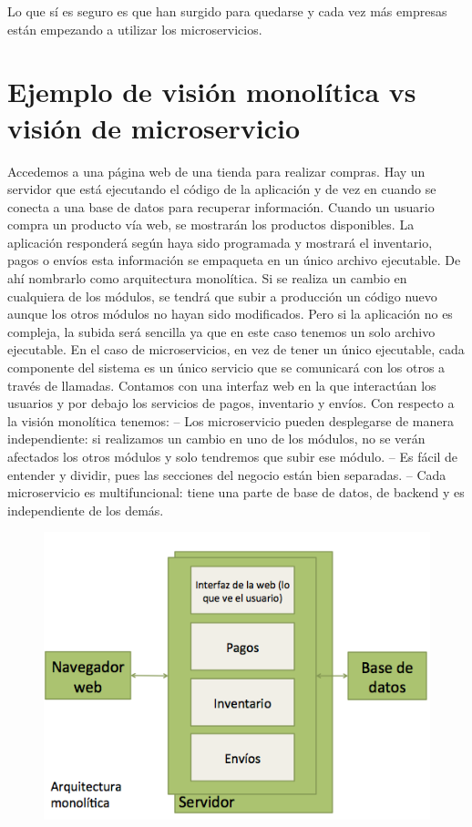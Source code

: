 \documentclass[12pt]{report} %
\begin{document}
Lo que sí es seguro es que han surgido para quedarse y cada vez más empresas están empezando a utilizar los microservicios.


\section{Ejemplo de visión monolítica vs visión de microservicio}



Accedemos a una página web de una tienda para realizar compras. Hay un servidor que está ejecutando el código de la aplicación y de vez en cuando se conecta a una base de datos para recuperar información.
Cuando un usuario compra un producto vía web, se mostrarán los productos disponibles. La aplicación responderá según haya sido programada y mostrará el inventario, pagos o envíos esta información se empaqueta en un único archivo ejecutable. De ahí nombrarlo como arquitectura monolítica.
Si se realiza un cambio en cualquiera de los módulos, se tendrá que subir a producción un código nuevo aunque los otros módulos no hayan sido modificados. 
Pero si la aplicación no es compleja, la subida será sencilla ya que en este caso tenemos un solo archivo ejecutable.
En el caso de microservicios, en vez de tener un único ejecutable, cada componente del sistema es un único servicio que se comunicará con los otros a través de llamadas.
Contamos con una interfaz web en la que interactúan los usuarios y por debajo los servicios de pagos, inventario y envíos.
Con respecto a la visión monolítica tenemos:
– Los microservicio pueden desplegarse de manera independiente: si realizamos un cambio en uno de los módulos, no se verán afectados los otros módulos y solo tendremos que subir ese módulo.
– Es fácil de entender y dividir, pues las secciones del negocio están bien separadas.
– Cada microservicio es multifuncional: tiene una parte de base de datos, de backend y es independiente de los demás. 
\begin{figure}
	\centering
	\includegraphics[width=0.7\linewidth]{imagenes/monolithic}
	\caption{}
	\label{fig:monolithic}
\end{figure}
\end{document}
